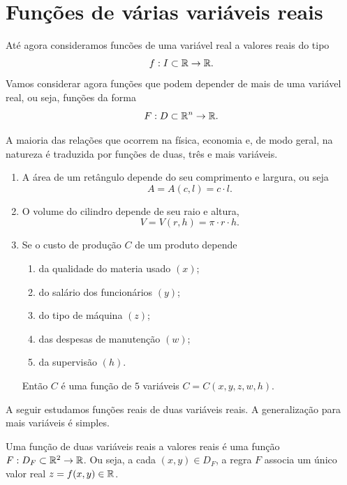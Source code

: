 \chapter{Funções de várias variáveis reais}

Até agora consideramos funcões de uma variável real a valores reais do tipo \[f:I\subset \mathbb{R} \to \mathbb{R}.\] Vamos considerar agora funções que podem depender de mais de uma variável real, ou seja, funções da forma \[F: D\subset \mathbb{R}^n \to \mathbb{R}.\]

A maioria das relações que ocorrem na física, economia e, de modo geral, na natureza é traduzida por funções de duas, três e mais variáveis.

\begin{example}
    \begin{enumerate}
        \item A área de um retângulo depende do seu comprimento e largura, ou seja \[A = A(c,l) = c\cdot l.\]
        \item O volume do cilindro depende de seu raio e altura, \[V = V(r,h) = \pi\cdot r\cdot h.\]
        \item Se o custo de produção \(C\) de um produto depende
            \begin{enumerate}
                \item da qualidade do materia usado \((x)\);
                \item do salário dos funcionários \((y)\);
                \item do tipo de máquina \((z)\);
                \item das despesas de manutenção \((w)\);
                \item da supervisão \((h)\).
            \end{enumerate}
        Então \(C\) é uma função de \(5\) variáveis \(C = C(x,y,z,w,h)\).
    \end{enumerate}
\end{example}

A seguir estudamos funções reais de duas variáveis reais. A generalização para mais variáveis é simples.

\begin{definition}
    Uma função de duas variáveis reais a valores reais é uma função \(F: D_F \subset \mathbb{R}^2 \to \mathbb{R}\). Ou seja, a cada \((x,y)\in D_F\), a regra \(F\) associa um único valor real \(z = f(x,y)\in\mathbb{R}\).
\end{definition}

